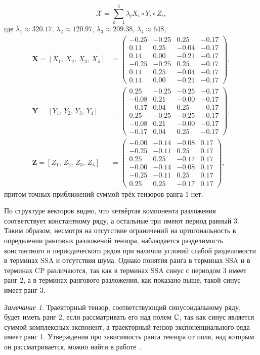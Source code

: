 \documentclass[specialist,
  substylefile=spbu.rtx,
subf,href,colorlinks=true, 12pt]{disser}
\theoremstyle{plain}
\theoremstyle{definition}
\theoremstyle{remark}
\newtheorem*{remark}{Замечание}
\begin{document}
\[
  \mathcal{X}=\sum_{k=1}^{4}\lambda_i X_i \circ Y_i\circ Z_i,
\]
где $\lambda_1 \approx 320.17$, $\lambda_2 \approx 120.97$, $\lambda_3 \approx 209.38$, $\lambda_4 \approx 648$,
\begin{align*}
  \mathbf{X}=[X_1,\, X_2,\, X_3,\, X_4] &=
  \begin{pmatrix}
    -0.25 & -0.25 & 0.25  & -0.17 \\
    0.11  & 0.25  & -0.04 & -0.17 \\
    0.14  & 0.00  & -0.21 & -0.17 \\
    -0.25 & -0.25 & 0.25  & -0.17 \\
    0.11  & 0.25  & -0.04 & -0.17 \\
    0.14  & 0.00  & -0.21 & -0.17
  \end{pmatrix},\\
  \mathbf{Y}=[Y_1,\, Y_2,\, Y_3,\, Y_4] &=
  \begin{pmatrix}
    0.25  & -0.25 & -0.25 & -0.17 \\
    -0.08 & 0.21  & -0.00 & -0.17 \\
    -0.17 & 0.04  & 0.25  & -0.17 \\
    0.25  & -0.25 & -0.25 & -0.17 \\
    -0.08 & 0.21  & -0.00 & -0.17 \\
    -0.17 & 0.04  & 0.25  & -0.17
  \end{pmatrix},\\
  \mathbf{Z}=[Z_1,\, Z_2,\, Z_3,\, Z_4] &=
  \begin{pmatrix}
    -0.00 & -0.14 & -0.08 & 0.17 \\
    -0.25 & -0.11 & 0.25  & 0.17 \\
    0.25  & 0.25  & -0.17 & 0.17 \\
    -0.00 & -0.14 & -0.08 & 0.17 \\
    -0.25 & -0.11 & 0.25  & 0.17 \\
    0.25  & 0.25  & -0.17 & 0.17
  \end{pmatrix},
\end{align*}
притом точных приближений суммой трёх тензоров ранга $1$ нет.

По структуре векторов видно, что четвёртая компонента разложения соответствует константному ряду, а остальные три имеют период равный $3$.
Таким образом, несмотря на отсутствие ограничений на ортогональность в определении ранговых разложений тензора, наблюдается
разделимость константного и периодического рядов при наличии условий слабой разделимости в терминах SSA и отсутствия
шума.
Однако понятия ранга в терминах SSA и в терминах CP различаются, так как в терминах SSA синус с периодом $3$ имеет ранг $2$, а в
терминах рангового разложения, как показано выше, такой синус имеет ранг $3$.
\begin{remark}
  Траекторный тензор, соответствующий синусоидальному ряду, будет иметь ранг 2, если рассматривать его
  над полем $\mathbb{C}$, так как синус является суммой комплексных экспонент, а траекторный тензор экспоненциального
  ряда имеет ранг 1.
  Утверждения про зависимость ранга тензора от поля, над которым он рассматривается, можно найти в
  работе~\cite{tensor-bg}.
\end{remark}
\end{document}
